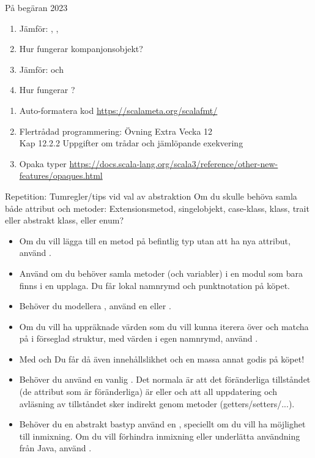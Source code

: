 \begin{Slide}{På begäran 2023}
\begin{enumerate}\SlideFontSmall
  \item Jämför: , ,  
  \item Hur fungerar kompanjonsobjekt? 
  \item Jämför:  och  
  \item Hur fungerar ?  
\end{enumerate}  
\vspace{1em}
\begin{enumerate}\SlideFontSmall
  \item Auto-formatera kod \hfill \url{https://scalameta.org/scalafmt/}
  \item Flertrådad programmering: Övning Extra Vecka 12 \\ Kap 12.2.2 Uppgifter om trådar och jämlöpande exekvering
  \item Opaka typer \hfill \url{https://docs.scala-lang.org/scala3/reference/other-new-features/opaques.html} 
\end{enumerate}  
\end{Slide}


\begin{Slide}{Repetition: Tumregler/tips vid val av abstraktion}\SlideFontSmall
Om du skulle behöva samla både attribut och metoder:
Extensionsmetod, singelobjekt, case-klass, klass, trait eller abstrakt klass, eller enum?
\begin{itemize}\SlideFontTiny
\item Om du vill lägga till en metod på befintlig typ utan att ha nya attribut, använd .
\item Använd  om du behöver samla metoder (och variabler) i en modul som bara finns i en upplaga. Du får lokal namnrymd och punktnotation på köpet.
\item Behöver du modellera , använd en  eller .  
\item Om du vill ha uppräknade värden som du vill kunna iterera över och matcha på i förseglad struktur, med värden i egen namnrymd, använd .
\item Med  och  Du får då även innehållslikhet och en massa annat godis på köpet!
\item Behöver du   använd en vanlig . Det normala är att det föränderliga tillståndet (de attribut som är föränderliga) är  eller  och att all uppdatering och avläsning av tillståndet sker indirekt genom metoder (getters/setters/...).
\item Behöver du en abstrakt bastyp använd en , speciellt om du vill ha möjlighet till inmixning.  Om du vill förhindra inmixning eller underlätta användning från Java, använd . 
\end{itemize}
\end{Slide}



